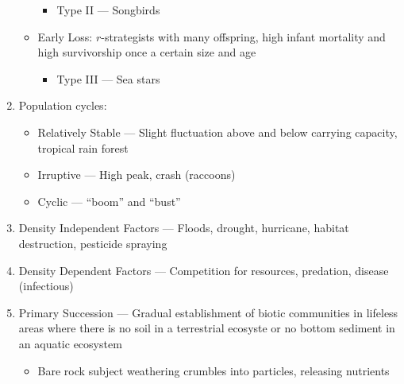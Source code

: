 \documentclass[12pt]{article}
\begin{document}
\begin{enumerate}
\begin{itemize}
        \begin{itemize}

          \item Type II — Songbirds

        \end{itemize}

      \item Early Loss: $r$-strategists with many offspring, high infant mortality and high survivorship once a certain size and age

        \begin{itemize}

          \item Type III — Sea stars

        \end{itemize}

    \end{itemize}

  \item Population cycles:

    \begin{itemize}

      \item Relatively Stable — Slight fluctuation above and below carrying capacity, tropical rain forest

      \item Irruptive — High peak, crash (raccoons)

      \item Cyclic — “boom” and “bust”

    \end{itemize}

  \item Density Independent Factors — Floods, drought, hurricane, habitat destruction, pesticide spraying

  \item Density Dependent Factors — Competition for resources, predation, disease (infectious)

  \item Primary Succession — Gradual establishment of biotic communities in lifeless areas where there is no soil in a terrestrial ecosyste or no bottom sediment in an aquatic ecosystem

    \begin{itemize}

      \item Bare rock subject weathering crumbles into particles, releasing nutrients


\end{itemize}
\end{enumerate}
\end{document}
